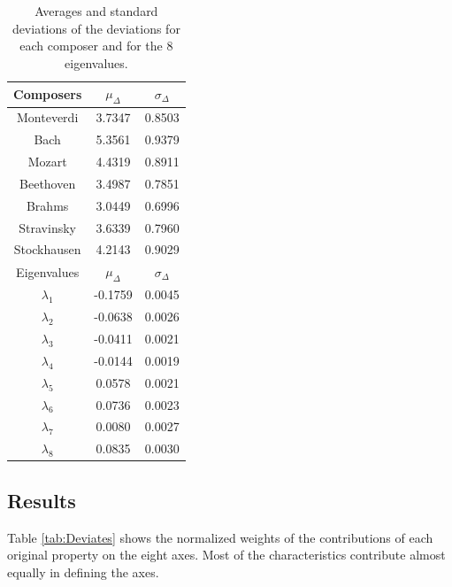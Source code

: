 \documentclass[
 aip,
 jmp,
 amsmath,amssymb,
 reprint,
]{revtex4-1}
\begin{document}
\begin{table}%
\caption{\label{tab:tableD}Averages and standard deviations of the 
deviations for each composer and for the 
8 eigenvalues.}

\begin{tabular}{|c||c|c|}
\hline

Composers & $\mu_{\Delta}$ & $\sigma_{\Delta}$ \\
\hline

Monteverdi     & 3.7347 & 0.8503 \\
Bach           & 5.3561 & 0.9379 \\
Mozart         & 4.4319 & 0.8911 \\
Beethoven      & 3.4987 & 0.7851 \\
Brahms         & 3.0449 & 0.6996 \\
Stravinsky     & 3.6339 & 0.7960 \\
Stockhausen    & 4.2143 & 0.9029 \\
\hline \hline
Eigenvalues & $\mu_{\Delta}$ & $\sigma_{\Delta}$ \\
\hline
$\lambda_1$ &  -0.1759 & 0.0045 \\
$\lambda_2$ &  -0.0638 & 0.0026 \\
$\lambda_3$ &  -0.0411 & 0.0021 \\
$\lambda_4$ &  -0.0144 & 0.0019 \\
$\lambda_5$ &   0.0578 & 0.0021 \\
$\lambda_6$ &   0.0736 & 0.0023 \\
$\lambda_7$ &   0.0080 & 0.0027 \\
$\lambda_8$ &   0.0835 & 0.0030 \\
\hline

\end{tabular}
\end{table}

\subsection{Results}

Table \ref{tab:Deviates} shows the normalized weights
of the contributions of each original property on the eight
axes. Most of the characteristics contribute almost equally
in defining the axes. 
\end{document}
